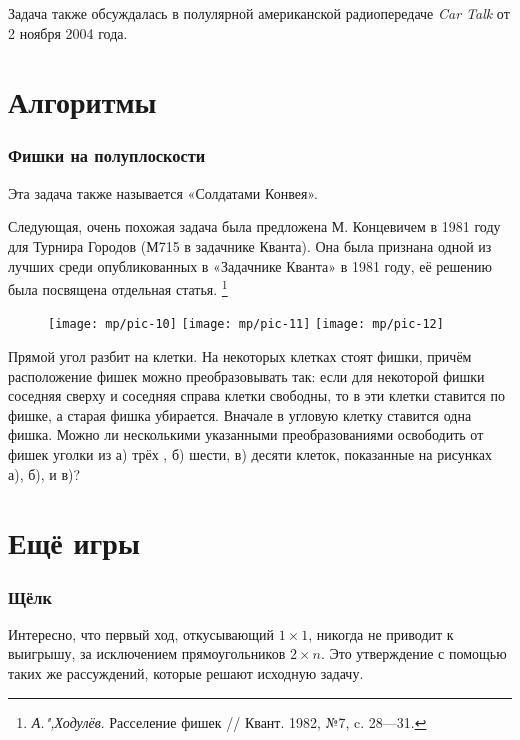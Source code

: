 \documentclass[twoside]{book}
\begin{document}
Задача также обсуждалась в полулярной американской радиопередаче \emph{Car Talk} от 2 ноября 2004 года.

\section{Алгоритмы}

\subsubsection{Фишки на полуплоскости}
Эта задача также называется «Солдатами Конвея».

Следующая, очень похожая задача была предложена М. Концевичем в 1981 году для Турнира Городов (М715 в задачнике Кванта).
Она была признана одной из лучших среди опубликованных в «Задачнике Кванта» в 1981 году,
её решению была посвящена отдельная статья.
\footnote{\emph{А.",Ходулёв}. Расселение фишек /\!/ Квант. 1982, №7, c. 28---31.}

\begin{figure}[!ht]
\centering
\texttt{[image: mp/pic-10]} %
\hskip7mm
\texttt{[image: mp/pic-11]}
\hskip7mm
\texttt{[image: mp/pic-12]}
\end{figure}

Прямой угол разбит на клетки.
На некоторых клетках стоят фишки, причём расположение фишек можно преобразовывать так: если для некоторой фишки соседняя сверху и соседняя справа клетки свободны, то в эти клетки ставится по фишке, а старая фишка убирается.
Вначале в угловую клетку ставится одна фишка.
Можно ли несколькими указанными преобразованиями освободить от фишек уголки из 
а) трёх , 
б) шести, 
в) десяти клеток,
показанные на рисунках а), б), и в)?


\section{Ещё игры}

\subsubsection*{Щёлк}
Интересно, что первый ход, откусывающий $1\times1$, никогда не приводит к выигрышу, за исключением прямоугольников $2\times n$.
Это утверждение  с помощью таких же рассуждений, которые решают исходную задачу.
\end{document}
